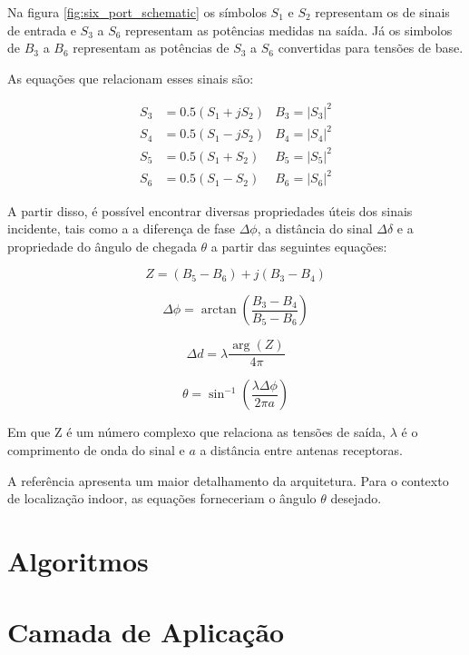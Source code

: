 Na figura \ref{fig:six_port_schematic} os símbolos \( S_1 \) e \( S_2 \) representam os de sinais de entrada e \( S_3 \) a \( S_6 \) representam as potências medidas na saída. Já os simbolos de \( B_3 \) a \( B_6 \) representam as potências de \( S_3 \) a \( S_6 \) convertidas para tensões de base.

As equações que relacionam esses sinais são:

\begin{align*}
    S_3 & = 0.5(S_1 + jS_2) & B_3 = \left | S_3 \right | ^2\\
    S_4 & = 0.5(S_1 - jS_2) & B_4 = \left | S_4 \right | ^2\\
    S_5 & = 0.5(S_1 + S_2)  & B_5 = \left | S_5 \right | ^2\\
    S_6 & = 0.5(S_1 - S_2)  & B_6 = \left | S_6 \right | ^2
\end{align*}

A partir disso, é possível encontrar diversas propriedades úteis dos sinais incidente, tais como a a diferença de fase \( \Delta\phi\), a distância do sinal \( \Delta\delta\) e a propriedade do ângulo de chegada \(\theta\) a partir das seguintes equações:

\begin{equation}
    Z = (B_5 - B_6) + j(B_3 - B_4)
\end{equation}

\begin{equation}
    \Delta \phi = \arctan \left ( \frac{B_3-B_4}{B_5-B_6} \right )
\end{equation}

\begin{equation}
    \Delta d = \lambda \frac{\arg\left ({Z}  \right ) }{4\pi }
\end{equation}

\begin{equation} \label{eq:eq_AoA}
    \theta = \sin^{-1}{(\frac{\lambda \Delta \phi}{2\pi a} )}
\end{equation}

Em que Z é um número complexo que relaciona as tensões de saída, \(\lambda\) é o comprimento de onda do sinal e \(a\) a distância entre antenas receptoras.

A referência \cite{art15} apresenta um maior detalhamento da arquitetura. Para o contexto de localização indoor, as equações forneceriam o ângulo \(\theta\) desejado.

\section{Algoritmos}


\section{Camada de Aplicação}

